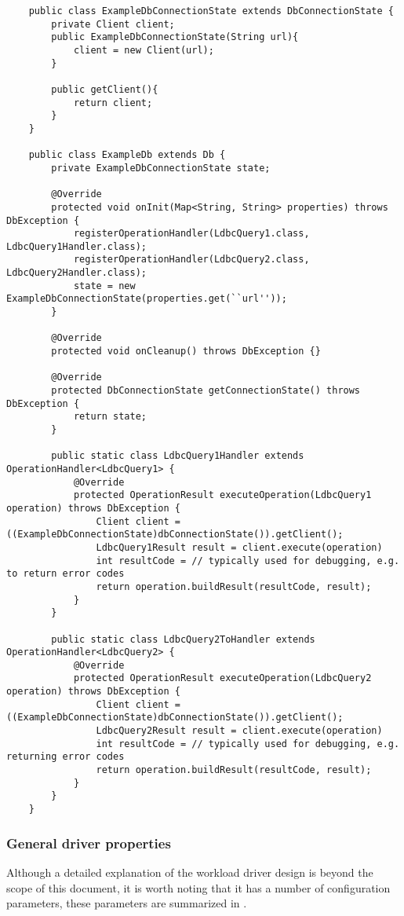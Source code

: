 {\footnotesize
	\begin{verbatim}
    public class ExampleDbConnectionState extends DbConnectionState {
        private Client client;		
        public ExampleDbConnectionState(String url){
            client = new Client(url);
        }

        public getClient(){
            return client;
        }
    }

    public class ExampleDb extends Db {
        private ExampleDbConnectionState state;

        @Override
        protected void onInit(Map<String, String> properties) throws DbException {
            registerOperationHandler(LdbcQuery1.class, LdbcQuery1Handler.class);
            registerOperationHandler(LdbcQuery2.class, LdbcQuery2Handler.class);
            state = new ExampleDbConnectionState(properties.get(``url''));
        }

        @Override
        protected void onCleanup() throws DbException {}

        @Override
        protected DbConnectionState getConnectionState() throws DbException {
            return state;
        }

        public static class LdbcQuery1Handler extends OperationHandler<LdbcQuery1> {
            @Override
            protected OperationResult executeOperation(LdbcQuery1 operation) throws DbException {
                Client client = ((ExampleDbConnectionState)dbConnectionState()).getClient();
                LdbcQuery1Result result = client.execute(operation)
                int resultCode = // typically used for debugging, e.g. to return error codes
                return operation.buildResult(resultCode, result);
            }
        }

        public static class LdbcQuery2ToHandler extends OperationHandler<LdbcQuery2> {
            @Override
            protected OperationResult executeOperation(LdbcQuery2 operation) throws DbException {
                Client client = ((ExampleDbConnectionState)dbConnectionState()).getClient();
                LdbcQuery2Result result = client.execute(operation)
                int resultCode = // typically used for debugging, e.g. returning error codes
                return operation.buildResult(resultCode, result);
            }
        }
    }
	\end{verbatim}
}

\subsubsection{General driver properties}
\label{ssub:general_driver_properties}
Although a detailed explanation of the workload driver design is beyond the
scope of this document, it is worth noting that it has a number of
configuration parameters, these parameters are summarized in
.

